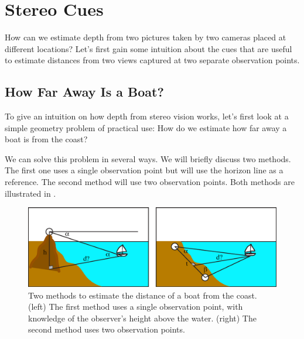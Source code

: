 \section{Stereo Cues}

How can we estimate depth from two pictures taken by two cameras placed at different locations? Let's first gain some intuition about the cues that are useful to estimate distances from two views captured at two separate observation points.

\subsection{How Far Away Is a Boat?}



To give an intuition on how depth from stereo vision works, let's first look at a simple geometry problem of practical use: How do we estimate how far away a boat is from the coast?

We can solve this problem in several ways. We will briefly discuss two methods. The first one uses a single observation point but will use the horizon line as a reference. The second method will use two observation points. Both methods are illustrated in \fig{\ref{fig:2boats}}.


\begin{figure}[t]
    \centerline{
        \includegraphics[width=1\linewidth]{figures/3d_scene_understanding/boats.eps}
    }
    \caption{Two methods to estimate the distance of a boat from the coast. (left) The first method uses a single observation point, with knowledge of the observer's height above the water.  (right) The second method uses two observation points.}
    \label{fig:2boats}
\end{figure}


